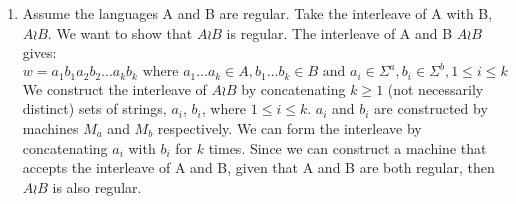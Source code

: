 \documentclass[10pt]{article}
\begin{document}
\begin{enumerate}
\begin{tikzpicture}[->,>=stealth',shorten >=1pt,auto,node distance=3cm,
                    semithick]
\end{tikzpicture} \\

 \\

\item 
Assume the languages A and B are regular.  Take the interleave of A with B, $A \wr B$.  We want to show that $A \wr B$ is regular.  The interleave of A and B $A \wr B$ gives:
\[
w=a_1b_1a_2b_2\dots a_kb_k \mbox{ where } a_1\dots a_k \in A, b_1 \dots b_k \in B \mbox { and } a_i \in \Sigma^a, b_i \in \Sigma^b, 1 \le i \le k\
\]
We construct the interleave of $A \wr B$ by concatenating $k \ge 1$ (not necessarily distinct) sets of strings, $a_i$, $b_i$, where $1 \le i \le k$.  $a_i$ and $b_i$ are constructed by machines $M_a$ and $M_b$ respectively.  We can form the interleave by concatenating $a_i$ with $b_i$ for $k$ times.  Since we can construct a machine that accepts the interleave of A and B, given that A and B are both regular, then $A \wr B$ is also regular.
\end{enumerate}
\end{document}
